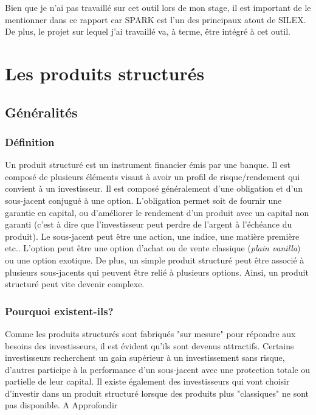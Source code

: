 \documentclass[11pt,a4paper]{article}
\begin{document}
  Bien que je n'ai pas travaillé sur cet outil lors de mon stage, il est important de le mentionner dans ce rapport car SPARK est l'un des principaux atout de SILEX. De plus, le projet sur lequel j'ai travaillé va, à terme, être intégré à cet outil.

\newpage
\section{Les produits structurés}
\subsection{Généralités}
\subsubsection{Définition}
Un produit structuré est un instrument financier émis par une banque. Il est composé de plusieurs éléments visant à avoir un profil de risque/rendement qui convient à un investisseur. Il est composé généralement d'une obligation et d'un sous-jacent conjugué à une option. L'obligation permet soit de fournir une garantie en capital, ou d'améliorer le rendement d'un produit avec un capital non garanti (c'est à dire que l'investisseur peut perdre de l'argent à l'échéance du produit). Le sous-jacent peut être une action, une indice, une matière première etc.. L'option peut être une option d'achat ou de vente classique (\textit{plain vanilla}) ou une option exotique. De plus, un simple produit structuré peut être associé à plusieurs sous-jacents qui peuvent être relié à plusieurs options. Ainsi, un produit structuré peut vite devenir complexe.

\subsubsection{Pourquoi existent-ils?}
Comme les produits structurés sont fabriqués "sur mesure" pour répondre aux besoins des investisseurs, il est évident qu'ils sont devenus attractifs. Certains investisseurs recherchent un gain supérieur à un investissement sans risque, d'autres participe à la performance d'un sous-jacent avec une protection totale ou partielle de leur capital. Il existe également des investisseurs qui vont choisir d'investir dans un produit structuré lorsque des produits plus "classiques" ne sont pas disponible. \vspace{0.5em} A Approfondir
\end{document}
